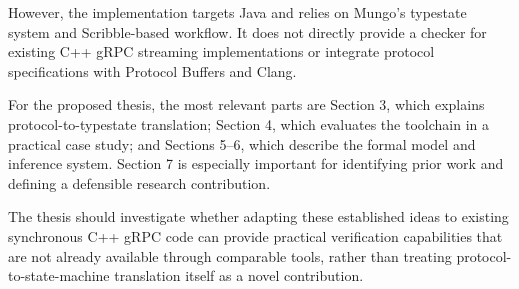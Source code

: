 However, the implementation targets Java and relies on Mungo's typestate system and Scribble-based workflow. It does not directly provide a checker for existing C++ gRPC streaming implementations or integrate protocol specifications with Protocol Buffers and Clang.

For the proposed thesis, the most relevant parts are Section 3, which explains protocol-to-typestate translation; Section 4, which evaluates the toolchain in a practical case study; and Sections 5–6, which describe the formal model and inference system. Section 7 is especially important for identifying prior work and defining a defensible research contribution.

The thesis should investigate whether adapting these established ideas to existing synchronous C++ gRPC code can provide practical verification capabilities that are not already available through comparable tools, rather than treating protocol-to-state-machine translation itself as a novel contribution.


